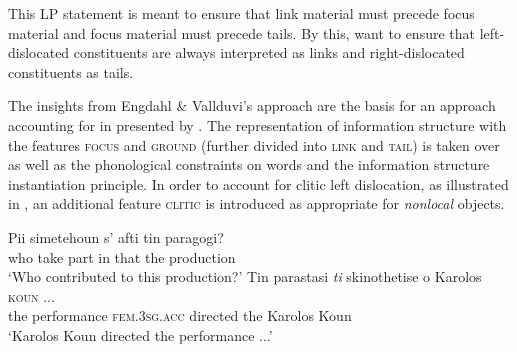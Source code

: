 \documentclass[output=paper
                ,modfonts
                ,nonflat
	        ,collection
	        ,collectionchapter
	        ,collectiontoclongg
 	        ,biblatex
                ,babelshorthands
                ,newtxmath
                ,draftmode
                ,colorlinks, citecolor=brown
]{./langsci/langscibook}
\begin{document}
  \label{fig:lp-catalan}
\z
This LP statement is meant to ensure that link material must precede
focus material and focus material must precede tails. By this,
\cite{EV96a} want to ensure that left-dislocated constituents are always
interpreted as links and right-dislocated constituents as tails.

The insights from Engdahl \& Vallduvi's approach are the basis for an
approach accounting for  in  presented by
\cite{AK2002a}. The representation of information structure with the
features \textsc{focus} and \textsc{ground} (further divided into
\textsc{link} and \textsc{tail}) is taken over as well as the
phonological constraints on words and the information structure
instantiation principle. In order to account for clitic left
dislocation, as illustrated in , an
additional feature \textsc{clitic} is introduced as appropriate for
\textit{nonlocal} objects.

\begin{exe}
  \ex\label{ex:clld-greek}
  \begin{xlist}
    \ex \gll Pii simetehoun s' afti tin paragogi?\\
             who {take part} in that the production\\
    \trans `Who contributed to this production?'
    \ex \gll Tin parastasi \textit{ti} skinothetise o Karolos \textsc{koun} ...\\
    the performance  \textsc{fem.3sg.acc} directed the Karolos Koun\\
   \trans `Karolos Koun directed the performance ...'
  \end{xlist}

\end{exe}
\end{document}
